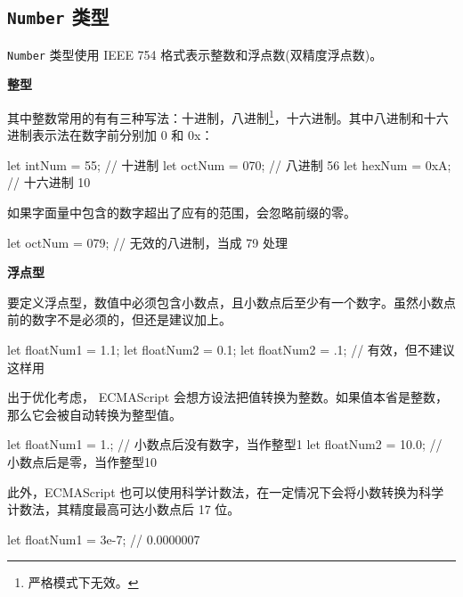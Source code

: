\subsection{\texttt{Number} 类型}

\texttt{Number} 类型使用 IEEE 754 格式表示整数和浮点数(双精度浮点数)。

\noindent\textbf{整型}

其中整数常用的有有三种写法：十进制，八进制\footnote{严格模式下无效。}，十六进制。其中八进制和十六进制表示法在数字前分别加 0 和 0x：

\begin{JavaScript}
let intNum = 55;    // 十进制
let octNum = 070;   // 八进制 56
let hexNum = 0xA;   // 十六进制 10
\end{JavaScript}

如果字面量中包含的数字超出了应有的范围，会忽略前缀的零。

\begin{JavaScript}
let octNum = 079;   // 无效的八进制，当成 79 处理
\end{JavaScript}


\noindent\textbf{浮点型}

要定义浮点型，数值中必须包含小数点，且小数点后至少有一个数字。虽然小数点前的数字不是必须的，但还是建议加上。

\begin{JavaScript}
let floatNum1 = 1.1;
let floatNum2 = 0.1;
let floatNum2 = .1;     // 有效，但不建议这样用
\end{JavaScript}

出于优化考虑， ECMAScript 会想方设法把值转换为整数。如果值本省是整数，那么它会被自动转换为整型值。

\begin{JavaScript}
let floatNum1 = 1.;     // 小数点后没有数字，当作整型1
let floatNum2 = 10.0;   // 小数点后是零，当作整型10
\end{JavaScript}

此外，ECMAScript 也可以使用科学计数法，在一定情况下会将小数转换为科学计数法，其精度最高可达小数点后 17 位。

\begin{JavaScript}
let floatNum1 = 3e-7;   // 0.0000007
\end{JavaScript}

